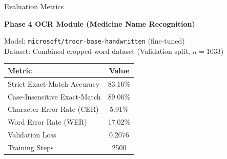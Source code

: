 \documentclass{beamer}
\begin{document}
\begin{frame}{Evaluation Metrics}

\centering
\textbf{Phase 4 OCR Module (Medicine Name Recognition)} \\
\vspace{0.4cm}

\small
Model: \texttt{microsoft/trocr-base-handwritten} (fine-tuned) \\
Dataset: Combined cropped-word dataset (Validation split, $n=1033$) \\
\normalsize

\begin{table}[h!]
\centering
\renewcommand{\arraystretch}{1.3} %
\begin{tabular}{l c}
\hline
\textbf{Metric} & \textbf{Value} \\
\hline
Strict Exact-Match Accuracy & 83.16\% \\
Case-Insensitive Exact-Match & 89.06\% \\
Character Error Rate (CER) & 5.91\% \\
Word Error Rate (WER) & 17.02\% \\
Validation Loss & 0.2076 \\
Training Steps & 2500 \\
\hline
\end{tabular}
\end{table}

\end{frame}
\end{document}
